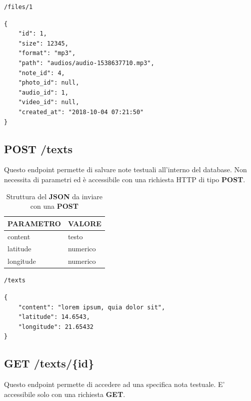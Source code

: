 \begin{lstlisting}[caption=Esempio di richiesta \textbf{GET}, xleftmargin=.3\textwidth, xrightmargin=.3\textwidth]
	/files/1
\end{lstlisting}
\pagebreak
\begin{lstlisting}[caption=Esempio \textbf{JSON} restituito con richiesta \textbf{GET /files/\{id\}}]
{
	"id": 1,
	"size": 12345,
	"format": "mp3",
	"path": "audios/audio-1538637710.mp3",
	"note_id": 4,
	"photo_id": null,
	"audio_id": 1,
	"video_id": null,
	"created_at": "2018-10-04 07:21:50"
}
\end{lstlisting}

\subsection{POST /texts}
Questo endpoint permette di salvare note testuali all'interno del database. Non necessita di parametri ed è accessibile con una richiesta HTTP di tipo \textbf{POST}.\\

\begin{table}[!h]
	\centering
	\begin{tabular}{@{}ll@{}}
		\toprule
		\textbf{PARAMETRO} & \textbf{VALORE}  \\ \midrule
		content            & testo\\ 
		latitude           & numerico\\ 
		longitude          & numerico\\ \bottomrule		
	\end{tabular}
\caption{Struttura del \textbf{JSON} da inviare con una \textbf{POST}}
\end{table}

\begin{lstlisting}[caption=Esempio di richiesta \textbf{POST}, xleftmargin=.32\textwidth, xrightmargin=.32\textwidth]
	/texts	
\end{lstlisting}

\begin{lstlisting}[caption=Esempio \textbf{JSON} da inviare con richiesta \textbf{POST /texts}]
{
	"content": "lorem ipsum, quia dolor sit",
	"latitude": 14.6543,
	"longitude": 21.65432
}
\end{lstlisting}

\subsection{GET /texts/\{id\}}
Questo endpoint permette di accedere ad una specifica nota testuale. E' accessibile solo con una richiesta \textbf{GET}.

